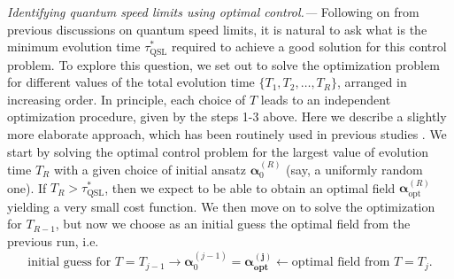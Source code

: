 {\it Identifying quantum speed limits using optimal control.---} Following on from previous discussions on quantum speed limits, it is natural to ask what is the minimum evolution time $\tau_{\text{QSL}}^\ast$ required to achieve a good solution for this control problem. To explore this question, we set out to solve the optimization problem for different values of the total evolution time $\{T_1,T_2,\ldots,T_R\}$, arranged in increasing order. In principle, each choice of $T$ leads to an independent optimization procedure, given by the steps 1-3 above. Here we describe a slightly more elaborate approach, which has been routinely used in previous studies \cite{caneva2009,murphy2010,goerz2011,poggi2015_qsl,goerz2017, ref2, ref3, ref4}. We start by solving the optimal control problem for the largest value of evolution time $T_R$ with a given choice of initial ansatz $\bm{\alpha}_0^{(R)}$ (say, a uniformly random one). If $T_R>\tau_{\text{QSL}}^\ast$, then we expect to be able to obtain an optimal field $\bm{\alpha}_{\text{opt}}^{(R)}$ yielding a very small cost function. We then move on to solve the optimization for $T_{R-1}$, but now we choose as an initial guess the optimal field from the previous run, i.e.
\begin{equation}
    \text{initial guess for $T=T_{j-1}$}\rightarrow \bm{\alpha}_0^{(j-1)} =  \bm{\alpha_{\text{opt}}^{(j)}}\leftarrow \text{optimal field from $T=T_j$}.
\end{equation}
